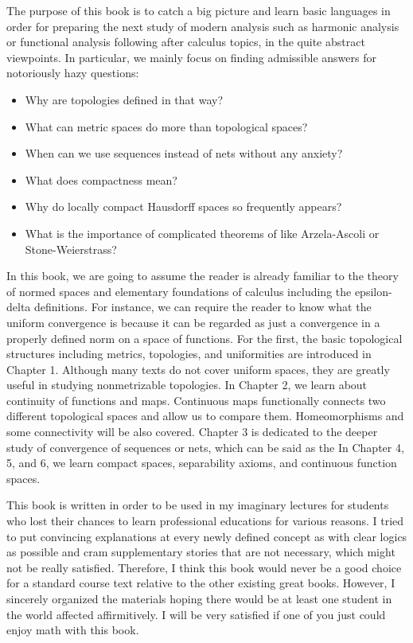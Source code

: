 \documentclass{../crs}
\begin{document}
The purpose of this book is to catch a big picture and learn basic languages in order for preparing the next study of modern analysis such as harmonic analysis or functional analysis following after calculus topics, in the quite abstract viewpoints.
In particular, we mainly focus on finding admissible answers for notoriously hazy questions:
\begin{itemize}
\item Why are topologies defined in that way?
\item What can metric spaces do more than topological spaces?
\item When can we use sequences instead of nets without any anxiety? 
\item What does compactness mean?
\item Why do locally compact Hausdorff spaces so frequently appears?
\item What is the importance of complicated theorems of like Arzela-Ascoli or Stone-Weierstrass?
\end{itemize}

In this book, we are going to assume the reader is already familiar to the theory of normed spaces and elementary foundations of calculus including the epsilon-delta definitions.
For instance, we can require the reader to know what the uniform convergence is because it can be regarded as just a convergence in a properly defined norm on a space of functions.
For the first, the basic topological structures including metrics, topologies, and uniformities are introduced in Chapter 1.
Although many texts do not cover uniform spaces, they are greatly useful in studying nonmetrizable topologies.
In Chapter 2, we learn about continuity of functions and maps.
Continuous maps functionally connects two different topological spaces and allow us to compare them.
Homeomorphisms and some connectivity will be also covered.
Chapter 3 is dedicated to the deeper study of convergence of sequences or nets, which can be said as the 
In Chapter 4, 5, and 6, we learn compact spaces, separability axioms, and continuous function spaces.

This book is written in order to be used in my imaginary lectures for students who lost their chances to learn professional educations for various reasons.
I tried to put convincing explanations at every newly defined concept as with clear logics as possible and cram supplementary stories that are not necessary, which might not be really satisfied.
Therefore, I think this book would never be a good choice for a standard course text relative to the other existing great books.
However, I sincerely organized the materials hoping there would be at least one student in the world affected affirmitively.
I will be very satisfied if one of you just could enjoy math with this book.
\end{document}
